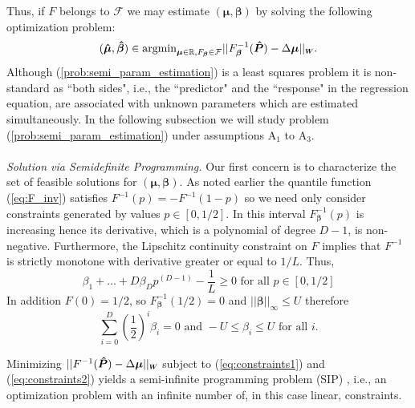 \documentclass[twoside,11pt]{article}
\newcommand*{\Scale}[2][4]{\scalebox{#1}{$#2$}}%
\begin{document}
Thus, if $F$ belongs to $\mathcal{F}$ we may estimate $(\boldsymbol{\mu},\boldsymbol{\beta} )$ by solving the following optimization problem:
\begin{equation}
\label{prob:semi_param_estimation}
(\boldsymbol{\hat  \mu}  ,  \boldsymbol{\hat \beta} ) \in \text{argmin}_{\boldsymbol{\mu} \in \mathbb{R}, F_{\boldsymbol{\beta}} \in \mathcal{F}}  ||F^{-1}_{\boldsymbol{\beta}} (\boldsymbol{\hat{P}}) - \Delta \boldsymbol{\mu} ||_{\Scale[.6]{\boldsymbol{W}}}.
\end{equation}
Although (\ref{prob:semi_param_estimation}) is a least squares problem it is non-standard as ``both sides", i.e., the ``predictor" and the ``response" in the regression equation, are associated with unknown parameters which are estimated simultaneously. In the following subsection we will study problem (\ref{prob:semi_param_estimation}) under assumptions $\mathrm{A}_1$ to $\mathrm{A}_3$.\\  
\\
\textit{Solution via Semidefinite Programming.} Our first concern is to characterize the set of feasible solutions for $(\boldsymbol{  \mu},\boldsymbol{\beta})$.  As noted earlier the quantile function (\ref{eq:F_inv}) satisfies $F^{-1}(p) = - F^{-1}(1-p)$ so we need only consider constraints generated by values $ p \in [0,1/2]$. In this interval $F^{-1}_{\boldsymbol{\beta}}(p)$ is increasing hence its derivative, which is a polynomial of degree $D-1$, is non-negative. Furthermore, the Lipschitz continuity constraint on $F$ implies that $F^{-1}$ is strictly monotone with derivative greater or equal to $1/L$. Thus,
\begin{equation}
\label{eq:constraints1}
    \beta_1 +...+ D \beta_D p^{(D-1)} - \frac{1}{L} \geq 0 \text{ for all } p \in [0,1/2] 
\end{equation}
 In addition $F(0) = 1/2$, so $F^{-1}_{\boldsymbol{\beta}}(1/2) = 0$ and  $||\boldsymbol{\beta}||_{\infty} \leq U$ therefore
\begin{equation}
\label{eq:constraints2}
     \sum_{i = 0}^D \left(\frac{1}{2}\right)^i \beta_i = 0
  \text{ and } -U \leq \beta_{i} \leq U \text{ for all } i. 
\end{equation}

Minimizing $||F^{-1}(\boldsymbol{\hat{P}}) - \Delta \boldsymbol{\mu}||_{\Scale[.6]{\boldsymbol{W}}}$ subject to (\ref{eq:constraints1}) and (\ref{eq:constraints2}) yields a  semi-infinite programming problem (SIP) \citep{mutapcic, stein}, i.e., an optimization problem with an infinite number of, in this case linear, constraints.  
\end{document}
